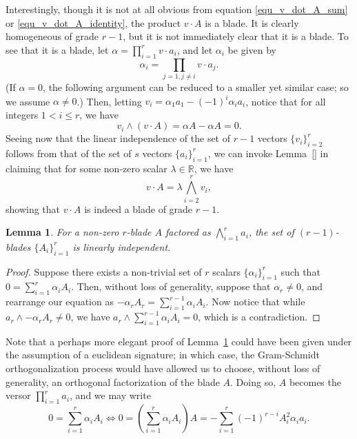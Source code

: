 \documentclass{birkjour}
\newtheorem{lem}[thm]{Lemma}
\theoremstyle{definition}
\theoremstyle{remark}
\numberwithin{equation}{section}
\newcommand{\R}{\mathbb{R}}
\begin{document}
Interestingly, though it is not at all obvious from equation \eqref{equ_v_dot_A_sum}
or \eqref{equ_v_dot_A_identity}, the product
$v\cdot A$ is a blade.  It is clearly homogeneous of grade $r-1$, but it is not
immediately clear that it is a blade.  To see that it is a blade, let $\alpha=\prod_{i=1}^r v\cdot a_i$,
and let $\alpha_i$ be given by
\begin{equation*}
\alpha_i=\prod_{j=1,j\neq i}v\cdot a_j.
\end{equation*}
(If $\alpha=0$, the following argument can be reduced to a smaller yet similar case; so
we assume $\alpha\neq 0$.)
Then, letting $v_i=\alpha_1a_1-(-1)^i\alpha_ia_i$, notice that for all integers $1<i\leq r$,
we have
\begin{equation*}
v_i\wedge (v\cdot A)=\alpha A-\alpha A=0.
\end{equation*}
Seeing now that the linear independence of the set of $r-1$ vectors
$\{v_i\}_{i=2}^r$ follows from that of the set of $s$ vectors $\{a_i\}_{i=1}^r$,
we can invoke Lemma~\ref{} in claiming that for some non-zero scalar $\lambda\in\R$,
we have
\begin{equation*}
v\cdot A = \lambda\bigwedge_{i=2}^r v_i,
\end{equation*}
showing that $v\cdot A$ is indeed a blade of grade $r-1$.

\begin{lem}\label{lem_A_i_lin_indep}
For a non-zero $r$-blade $A$ factored as $\bigwedge_{i=1}^r a_i$, the set of
$(r-1)$-blades $\{A_i\}_{i=1}^r$ is linearly independent.
\end{lem}
\begin{proof}
Suppose there exists a non-trivial set of $r$ scalars $\{\alpha_i\}_{i=1}^r$
such that $0 = \sum_{i=1}^r\alpha_i A_i$.
Then, without loss of generality, suppose that $\alpha_r\neq 0$, and rearrange
our equation as $-\alpha_rA_r=\sum_{i=1}^{r-1}\alpha_iA_i$.  Now notice
that while $a_r\wedge-\alpha_rA_r\neq 0$, we have $a_r\wedge\sum_{i=1}^{r-1}\alpha_iA_i=0$,
which is a contradiction.
\end{proof}

Note that a perhaps more elegant proof of Lemma~\ref{lem_A_i_lin_indep} could have been given
under the assumption
of a euclidean signature; in which case, the Gram-Schmidt orthogonalization process would have
allowed us to choose, without loss of generality, an orthogonal factorization of the blade $A$.
Doing so, $A$ becomes the versor $\prod_{i=1}^r a_i$, and we may write
\begin{equation*}
0 = \sum_{i=1}^r \alpha_iA_i \iff
0=\left(\sum_{i=1}^r\alpha_iA_i\right)A = -\sum_{i=1}^r(-1)^{r-i}A_i^2\alpha_ia_i.
\end{equation*}



\begin{thebibliography}{9}

\end{thebibliography}
\end{document}
